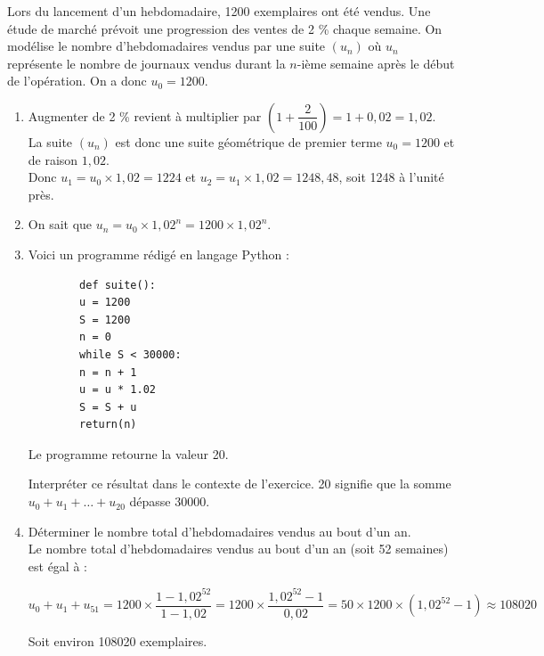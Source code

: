Lors du lancement d’un hebdomadaire, 1200 exemplaires ont été vendus. Une étude de marché prévoit une progression des ventes de 2 \% chaque semaine. On modélise le nombre d’hebdomadaires vendus par une suite $(u_n)$ où $u_n$ représente le nombre de journaux vendus durant la $n$-ième semaine après le début de l’opération. On a donc $u_0 = 1200$.

\begin{enumerate}
	\item 	Augmenter de 2 \% revient à multiplier par $\left(1 + \dfrac{2}{100}\right) = 1 + 0,02 = 1,02$.\\
	 La suite $(u_n)$ est donc une suite géométrique de premier terme $u_0 = 1200$ et de raison $1,02$.\\
	  Donc $u_1 = u_0 \times 1,02 = 1224$ et $u_2 = u_1 \times 1,02 = 1248,48$, soit 1248 à l’unité près.
	
	\item	On sait que $u_n = u_0 \times 1,02^n = 1200 \times 1,02^n$.
	
	\item	Voici un programme rédigé en langage Python :
	
	\begin{verbatim}
		def suite():
		u = 1200
		S = 1200
		n = 0
		while S < 30000:
		n = n + 1
		u = u * 1.02
		S = S + u
		return(n)
	\end{verbatim}
	
	Le programme retourne la valeur 20.
	
	Interpréter ce résultat dans le contexte de l’exercice. 20 signifie que la somme $u_0 + u_1 + \ldots + u_{20}$ dépasse 30000.
	
	\item 	Déterminer le nombre total d’hebdomadaires vendus au bout d’un an.\\
	Le nombre total d’hebdomadaires vendus au bout d’un an (soit 52 semaines) est égal à :
	
	\[
	u_0 + u_1 + u_{51} = 1200 \times \dfrac{1 - 1,02^{52}}{1 - 1,02} = 1200 \times \dfrac{1,02^{52} - 1}{0,02} = 50 \times 1200 \times (1,02^{52} - 1) \approx 108020
	\]
	
	Soit environ 108020 exemplaires.
\end{enumerate}
